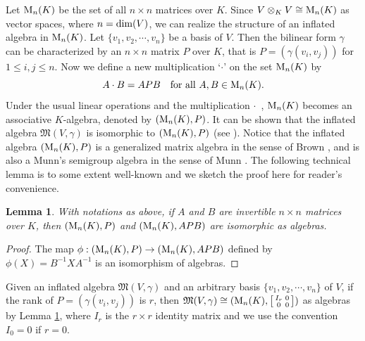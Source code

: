 \documentclass[reqno]{amsart}
\theoremstyle{plain}
\newtheorem{lemma}[theorem]{Lemma}
\theoremstyle{definition}
\begin{document}
Let ${\rm M}_n(K)$ be the set of all $n\times n$ matrices over $K$.
Since $V \otimes_K V\cong {\rm M}_n(K)$ as vector spaces,
where $n={\rm dim}(V)$, we can realize
the structure of an inflated algebra in ${\rm M}_n(K)$.
Let $\{v_1, v_2, \cdots, v_n\}$ be a basis of $V$.
Then the bilinear form $\gamma$ can be characterized by an $n\times n$
matrix $P$ over $K$, that is $P= (\gamma(v_i, v_j)) $ for $1 \leq i, j \leq n$. Now we define a new multiplication ‘$\cdot$’ on the set
${\rm M}_n(K)$ by
$$
A \cdot B =APB \quad \text{for all } A,B \in {\rm M}_n(K).
$$
Under the usual linear operations and the multiplication $\cdot$\, ,
${\rm M}_n(K)$ becomes an associative $K$-algebra,
denoted by $({\rm M}_n(K), P)$. It can be shown that the inflated algebra $\mathfrak{M}(V, \gamma)$ is isomorphic to $({\rm M}_n(K), P)$
(see \cite[Lemma 4.1]{xi2}).
Notice that the inflated algebra $({\rm M}_n(K), P)$ is a generalized matrix algebra in the sense of Brown \cite{Brown}, and is also a Munn's semigroup
algebra in the sense of Munn \cite{Munn}.
The following technical lemma is to some extent well-known
and we sketch the proof here for reader's convenience.

\begin{lemma}\label{lemma1}
With notations as above, if $A$ and $B$ are invertible $n\times n$ matrices over $K$, then $({\rm M}_n(K), P)$ and $({\rm M}_n(K), APB)$ are isomorphic as algebras.
\end{lemma}
\begin{proof}
The map $\phi:({\rm M}_n(K), P)\to ({\rm M}_n(K), APB)$
defined by $\phi(X)=B^{-1} X A^{-1}$
is an isomorphism of algebras.
\end{proof}

Given an inflated algebra $\mathfrak{M}(V, \gamma)$ and an arbitrary basis $\{v_1, v_2, \cdots, v_n\}$ of $V$, if the rank of $P= (\gamma(v_i, v_j))$ is $r$,
then $\mathfrak{M}(V, \gamma)\cong ({\rm M}_n(K), 
\left[\smallmatrix I_{r} & 0 \\ 0 & 0 \endsmallmatrix \right] )$ as algebras by Lemma \ref{lemma1},
where $I_{r}$ is the $r \times r$ identity matrix and we
use the convention $I_0=0$ if $r=0$.
\end{document}
